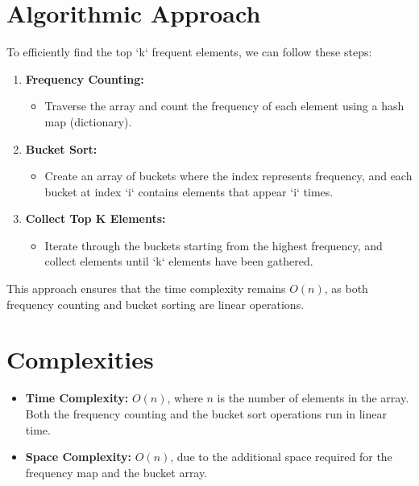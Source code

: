\section*{Algorithmic Approach}
To efficiently find the top `k` frequent elements, we can follow these steps:

\begin{enumerate}
    \item \textbf{Frequency Counting:}
    \begin{itemize}
        \item Traverse the array and count the frequency of each element using a hash map (dictionary).
    \end{itemize}
    
    \item \textbf{Bucket Sort:}
    \begin{itemize}
        \item Create an array of buckets where the index represents frequency, and each bucket at index `i` contains elements that appear `i` times.
    \end{itemize}
    
    \item \textbf{Collect Top K Elements:}
    \begin{itemize}
        \item Iterate through the buckets starting from the highest frequency, and collect elements until `k` elements have been gathered.
    \end{itemize}
\end{enumerate}

This approach ensures that the time complexity remains \(O(n)\), as both frequency counting and bucket sorting are linear operations.


\section*{Complexities}

\begin{itemize}
    \item \textbf{Time Complexity:} \(O(n)\), where \(n\) is the number of elements in the array. Both the frequency counting and the bucket sort operations run in linear time.
    \item \textbf{Space Complexity:} \(O(n)\), due to the additional space required for the frequency map and the bucket array.
\end{itemize}

